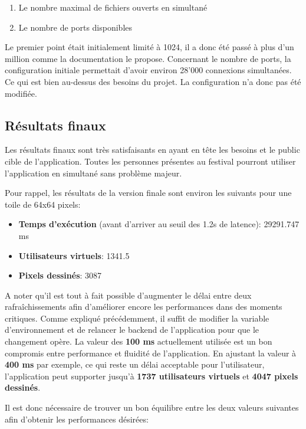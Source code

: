 \begin{enumerate}
  \item Le nombre maximal de fichiers ouverts en simultané
  \item Le nombre de ports disponibles
\end{enumerate}

Le premier point était initialement limité à 1024, il a donc été passé à plus d'un million comme la documentation le propose. Concernant le nombre de ports, la configuration initiale permettait d'avoir environ 28'000 connexions simultanées. Ce qui est bien au-dessus des besoins du projet. La configuration n'a donc pas été modifiée.

\subsection{Résultats finaux}

Les résultats finaux sont très satisfaisants en ayant en tête les besoins et le public cible de l'application. Toutes les personnes présentes au festival pourront utiliser l'application en simultané sans problème majeur.

Pour rappel, les résultats de la version finale sont environ les suivants pour une toile de 64x64 pixels:

\begin{itemize}
  \item \textbf{Temps d'exécution} (avant d'arriver au seuil des 1.2s de latence): 29291.747 ms
  \item \textbf{Utilisateurs virtuels}: 1341.5
  \item \textbf{Pixels dessinés}: 3087
\end{itemize}

A noter qu'il est tout à fait possible d'augmenter le délai entre deux rafraîchissements afin d'améliorer encore les performances dans des moments critiques. Comme expliqué précédemment, il suffit de modifier la variable d'environnement et de relancer le backend de l'application pour que le changement opère. La valeur des \textbf{100 ms} actuellement utilisée est un bon compromis entre performance et fluidité de l'application. En ajustant la valeur à \textbf{400 ms} par exemple, ce qui reste un délai acceptable pour l'utilisateur, l'application peut supporter jusqu'à \textbf{1737 utilisateurs virtuels} et \textbf{4047 pixels dessinés}.

Il est donc nécessaire de trouver un bon équilibre entre les deux valeurs suivantes afin d'obtenir les performances désirées:

